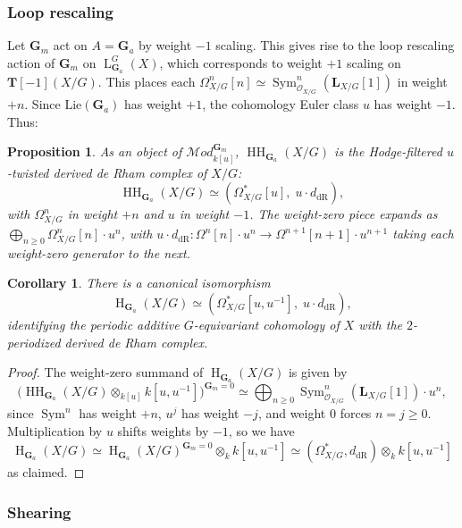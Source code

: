 \documentclass[12pt, oneside]{amsart}
\numberwithin{equation}{section}
\newtheorem{proposition}[subsubsection]{Proposition}
\newtheorem{corollary}[subsubsection]{Corollary}
\theoremstyle{remark}
\theoremstyle{plain}
\renewcommand{\ge}{\geqslant}
\renewcommand{\geq}{\geqslant}
\newcommand{\MOD}{\mathcal{M}\textit{od}}
\newcommand{\Loop}{\operatorname{L}}
\newcommand{\OO}{\mathcal{O}}
\newcommand{\GGa}{\mathbf{G}_{a}}
\newcommand{\GGm}{\mathbf{G}_{m}}
\newcommand{\TT}{\mathbf{T}}
\newcommand{\HH}{\operatorname{HH}}
\newcommand{\Hcoh}{\operatorname{H}}
\DeclareMathOperator{\Sym}{Sym}
\begin{document}
\subsubsection{Loop rescaling}

Let $\GGm$ act on $A=\GGa$ by weight $-1$ scaling.
This gives rise to the loop rescaling action of $\GGm$ on $\Loop_{\GGa}^G(X)$, which corresponds to weight $+1$ scaling on $\TT[-1](X/G)$.
This places each $\Omega^n_{X/G}[n] \simeq \Sym^n_{\OO_{X/G}}(\mathbf{L}_{X/G}[1])$ in weight $+n$.
Since $\mathrm{Lie}(\GGa)$ has weight $+1$, the cohomology Euler class $u$ has weight $-1$.
Thus:

\begin{proposition}\label{prop:Ga comparison}
  As an object of $\MOD_{k[u]}^{\GGm}$, $\HH_{\GGa}(X/G)$ is the Hodge-filtered $u$-twisted derived de Rham complex of $X/G$:
  \[
    \HH_{\GGa}(X/G) \simeq (\Omega^*_{X/G}[u],\; u \cdot d_{\mathrm{dR}}),
  \]
  with $\Omega^n_{X/G}$ in weight $+n$ and $u$ in weight $-1$.
  The weight-zero piece expands as $\bigoplus_{n \ge 0} \Omega^n_{X/G}[n] \cdot u^n$, with $u \cdot d_{\mathrm{dR}}\colon \Omega^n[n] \cdot u^n \to \Omega^{n+1}[n+1] \cdot u^{n+1}$ taking each weight-zero generator to the next.
\end{proposition}

\begin{corollary}\label{cor:Ga comparison periodic}
There is a canonical isomorphism
\[
  \Hcoh_{\GGa}(X/G) \simeq (\Omega^*_{X/G}[u, u^{-1}],\; u \cdot d_{\mathrm{dR}}),
\]
identifying the periodic additive $G$-equivariant cohomology of $X$ with the $2$-periodized derived de Rham complex.
\end{corollary}

\begin{proof}
The weight-zero summand of $\Hcoh_{\GGa}(X/G)$ is given by
\[ \bigl(\HH_{\GGa}(X/G) \otimes_{k[u]} k[u, u^{-1}]\bigr)^{\GGm = 0} \simeq \bigoplus_{n \ge 0} \Sym_{\OO_{X/G}}^n(\mathbf{L}_{X/G}[1]) \cdot u^n, \]
since $\Sym^n$ has weight $+n$, $u^j$ has weight $-j$, and weight $0$ forces $n = j \geq 0$.
Multiplication by $u$ shifts weights by $-1$, so we have
$$\Hcoh_{\GGa}(X/G) \simeq \Hcoh_{\GGa}(X/G)^{\GGm = 0} \otimes_k k[u, u^{-1}] \simeq (\Omega^*_{X/G}, d_{\mathrm{dR}}) \otimes_k k[u, u^{-1}]$$
as claimed.
\end{proof}

\subsubsection{Shearing}
\end{document}
